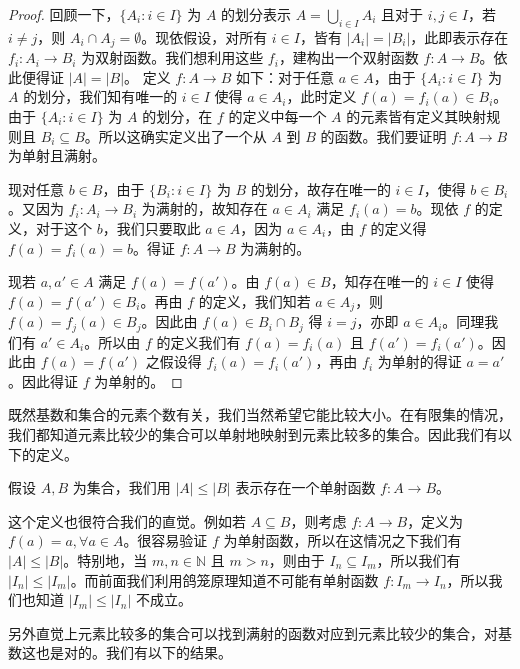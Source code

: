 \begin{proof}
回顾一下，$\{A_i : i \in I\}$ 为 $A$ 的划分表示 $A = \bigcup_{i \in I} A_i$ 且对于 $i, j \in I$，若 $i \neq j$，则 $A_i \cap A_j = \emptyset$。现依假设，对所有 $i \in I$，皆有 $|A_i| = |B_i|$，此即表示存在 $f_i : A_i \to B_i$ 为双射函数。我们想利用这些 $f_i$，建构出一个双射函数 $f : A \to B$。依此便得证 $|A| = |B|$。
定义 $f : A \to B$ 如下：对于任意 $a \in A$，由于 $\{A_i : i \in I\}$ 为 $A$ 的划分，我们知有唯一的 $i \in I$ 使得 $a \in A_i$，此时定义 $f(a) = f_i(a) \in B_i$。由于 $\{A_i : i \in I\}$ 为 $A$ 的划分，在 $f$ 的定义中每一个 $A$ 的元素皆有定义其映射规则且 $B_i \subseteq B$。所以这确实定义出了一个从 $A$ 到 $B$ 的函数。我们要证明 $f : A \to B$ 为单射且满射。

现对任意 $b \in B$，由于 $\{B_i : i \in I\}$ 为 $B$ 的划分，故存在唯一的 $i \in I$，使得 $b \in B_i$。又因为 $f_i : A_i \to B_i$ 为满射的，故知存在 $a \in A_i$ 满足 $f_i(a) = b$。现依 $f$ 的定义，对于这个 $b$，我们只要取此 $a \in A$，因为 $a \in A_i$，由 $f$ 的定义得 $f(a) = f_i(a) = b$。得证 $f : A \to B$ 为满射的。

现若 $a, a' \in A$ 满足 $f(a) = f(a')$。由 $f(a) \in B$，知存在唯一的 $i \in I$ 使得 $f(a) = f(a') \in B_i$。再由 $f$ 的定义，我们知若 $a \in A_j$，则 $f(a) = f_j(a) \in B_j$。因此由 $f(a) \in B_i \cap B_j$ 得 $i = j$，亦即 $a \in A_i$。同理我们有 $a' \in A_i$。所以由 $f$ 的定义我们有 $f(a) = f_i(a)$ 且 $f(a') = f_i(a')$。因此由 $f(a) = f(a')$ 之假设得 $f_i(a) = f_i(a')$，再由 $f_i$ 为单射的得证 $a = a'$。因此得证 $f$ 为单射的。
\end{proof}

既然基数和集合的元素个数有关，我们当然希望它能比较大小。在有限集的情况，我们都知道元素比较少的集合可以单射地映射到元素比较多的集合。因此我们有以下的定义。

\begin{definition}
假设 $A, B$ 为集合，我们用 $|A| \leq |B|$ 表示存在一个单射函数 $f : A \to B$。
\end{definition}

这个定义也很符合我们的直觉。例如若 $A \subseteq B$，则考虑 $f : A \to B$，定义为 $f(a) = a, \forall a \in A$。很容易验证 $f$ 为单射函数，所以在这情况之下我们有 $|A| \leq |B|$。特别地，当 $m, n \in \mathbb{N}$ 且 $m > n$，则由于 $I_n \subseteq I_m$，所以我们有 $|I_n| \leq |I_m|$。而前面我们利用鸽笼原理知道不可能有单射函数 $f : I_m \to I_n$，所以我们也知道 $|I_m| \leq |I_n|$ 不成立。

另外直觉上元素比较多的集合可以找到满射的函数对应到元素比较少的集合，对基数这也是对的。我们有以下的结果。

